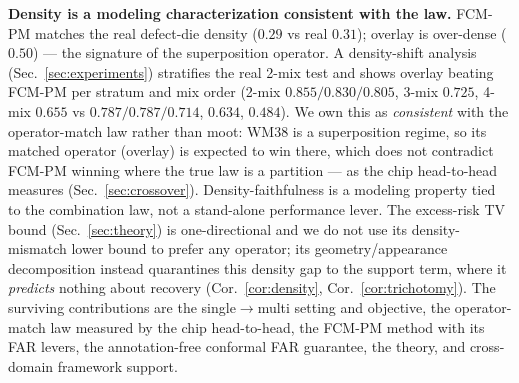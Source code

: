 \documentclass[11pt]{article}
\begin{document}
\textbf{Density is a modeling characterization consistent with the law.} FCM-PM
matches the real defect-die density ($0.29$ vs real $0.31$); overlay is over-dense
($0.50$) --- the signature of the superposition operator. A density-shift analysis
(Sec.~\ref{sec:experiments}) stratifies the real 2-mix test and shows overlay beating
FCM-PM per stratum and mix order (2-mix $0.855/0.830/0.805$, 3-mix $0.725$, 4-mix
$0.655$ vs $0.787/0.787/0.714$, $0.634$, $0.484$). We own this as \emph{consistent}
with the operator-match law rather than moot: WM38 is a superposition regime, so its
matched operator (overlay) is expected to win there, which does not contradict FCM-PM
winning where the true law is a partition --- as the chip head-to-head measures
(Sec.~\ref{sec:crossover}). Density-faithfulness is a modeling property tied to the
combination law, not a stand-alone performance lever. The excess-risk TV bound
(Sec.~\ref{sec:theory}) is one-directional and we do not use its density-mismatch lower
bound to prefer any operator; its geometry/appearance decomposition instead quarantines this
density gap to the support term, where it \emph{predicts} nothing about recovery
(Cor.~\ref{cor:density}, Cor.~\ref{cor:trichotomy}). The surviving contributions are
the single$\to$multi setting and objective, the operator-match law measured by the chip
head-to-head, the FCM-PM method with its FAR levers, the annotation-free conformal FAR
guarantee, the theory,
and cross-domain framework support.
\end{document}
